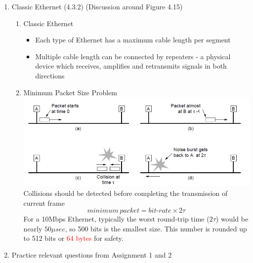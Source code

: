 \documentclass[a4paper,10pt]{article}
\newcommand{\red}[1]{\textcolor{red}{#1}}
\begin{document}
\begin{enumerate}
  \item Classic Ethernet (4.3.2) (Discussion around Figure 4.15)
    \begin{enumerate}
      \item Classic Ethernet
        \begin{itemize}
          \item Each type of Ethernet has a maximum cable length per segment
          \item Multiple cable length can be connected by repeaters - a physical device which receives, amplifies and retransmits signals in both directions
        \end{itemize}
      \item Minimum Packet Size Problem
        \newline\includegraphics[width=\textwidth]{collision}
        \newline Collisions should be detected before completing the transmission of current frame
        $$ minimum\ packet = \textit{bit-rate} \times 2\tau $$
        For a 10Mbps Ethernet, typically the worst round-trip time ($2\tau$) would be nearly $50\mu sec$, so 500 bits is the smallest size. This number is rounded up to 512 bits or \red{64 bytes} for safety.
    \end{enumerate}
  
  \item Practice relevant questions from Assignment 1 and 2
\end{enumerate}
\end{document}
